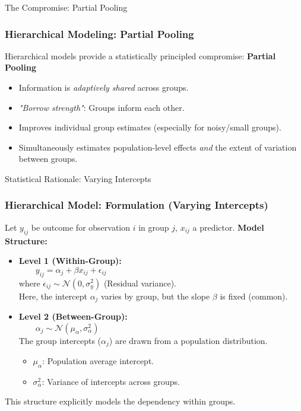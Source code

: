 \documentclass[aspectratio=169]{beamer}
\begin{document}
\begin{frame}{The Compromise: Partial Pooling}
    \frametitle{Hierarchical Modeling: Partial Pooling}
    Hierarchical models provide a statistically principled compromise:
    \medskip
    \centering
    \large\textbf{Partial Pooling}\par
    \medskip
    \pause
    \begin{itemize}
        \item Information is \emph{adaptively shared} across groups.
        \pause
        \item \emph{"Borrow strength"}: Groups inform each other.
        \pause
        \item Improves individual group estimates (especially for noisy/small groups).
        \pause
        \item Simultaneously estimates population-level effects \emph{and} the extent of variation between groups.
    \end{itemize}
\end{frame}

\begin{frame}[fragile]{Statistical Rationale: Varying Intercepts}
    \frametitle{Hierarchical Model: Formulation (Varying Intercepts)}
    Let $y_{ij}$ be outcome for observation $i$ in group $j$, $x_{ij}$ a predictor.
    \pause
    \textbf{Model Structure:}
    \begin{itemize}
        \item \textbf{Level 1 (Within-Group):}
        \\[1ex]
          $ \qquad y_{ij} = \alpha_j + \beta x_{ij} + \epsilon_{ij} $
        \\[1ex]
          where $\epsilon_{ij} \sim \mathcal{N}(0, \sigma^2_y)$ (Residual variance).
        \\[1ex]
          Here, the intercept $\alpha_j$ varies by group, but the slope $\beta$ is fixed (common).
        \pause
        \item \textbf{Level 2 (Between-Group):}
        \\[1ex]
          $ \qquad \alpha_j \sim \mathcal{N}(\mu_{\alpha}, \sigma^2_{\alpha}) $
        \\[1ex]
          The group intercepts ($\alpha_j$) are drawn from a population distribution.
        \\[1ex]
          \begin{itemize}
            \item $\mu_{\alpha}$: Population average intercept.
            \item $\sigma^2_{\alpha}$: Variance of intercepts across groups.
          \end{itemize}
    \end{itemize}
    \pause
    \vfill
    This structure explicitly models the dependency within groups.
\end{frame}
\end{document}
